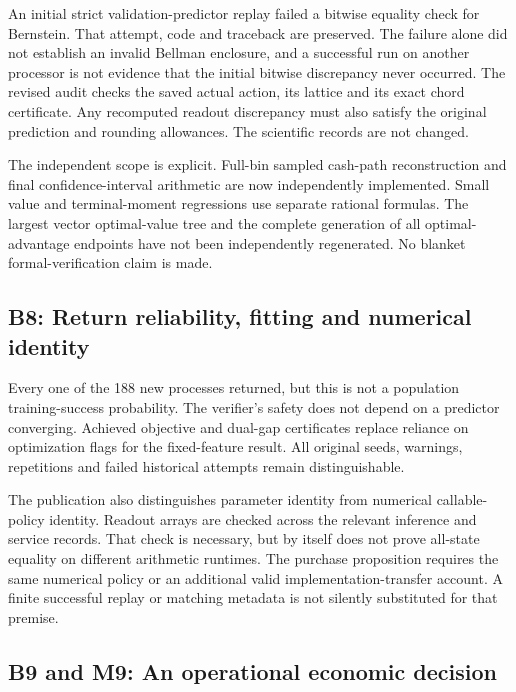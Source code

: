 An initial strict validation-predictor replay failed a bitwise equality
check for Bernstein. That attempt, code and traceback are preserved. The
failure alone did not establish an invalid Bellman enclosure, and a
successful run on another processor is not evidence that the initial
bitwise discrepancy never occurred. The revised audit checks the saved
actual action, its lattice and its exact chord certificate. Any
recomputed readout discrepancy must also satisfy the original prediction
and rounding allowances. The scientific records are not changed.

The independent scope is explicit. Full-bin sampled cash-path
reconstruction and final confidence-interval arithmetic are now
independently implemented. Small value and terminal-moment regressions
use separate rational formulas. The largest vector optimal-value tree
and the complete generation of all optimal-advantage endpoints have not
been independently regenerated. No blanket formal-verification claim is
made.

\hypertarget{b8-return-reliability-fitting-and-numerical-identity}{%
\subsection{B8: Return reliability, fitting and numerical
identity}\label{b8-return-reliability-fitting-and-numerical-identity}}

Every one of the 188 new processes returned, but this is not a
population training-success probability. The verifier's safety does not
depend on a predictor converging. Achieved objective and dual-gap
certificates replace reliance on optimization flags for the
fixed-feature result. All original seeds, warnings, repetitions and
failed historical attempts remain distinguishable.

The publication also distinguishes parameter identity from numerical
callable-policy identity. Readout arrays are checked across the relevant
inference and service records. That check is necessary, but by itself
does not prove all-state equality on different arithmetic runtimes. The
purchase proposition requires the same numerical policy or an additional
valid implementation-transfer account. A finite successful replay or
matching metadata is not silently substituted for that premise.

\hypertarget{b9-and-m9-an-operational-economic-decision}{%
\subsection{B9 and M9: An operational economic
decision}\label{b9-and-m9-an-operational-economic-decision}}

